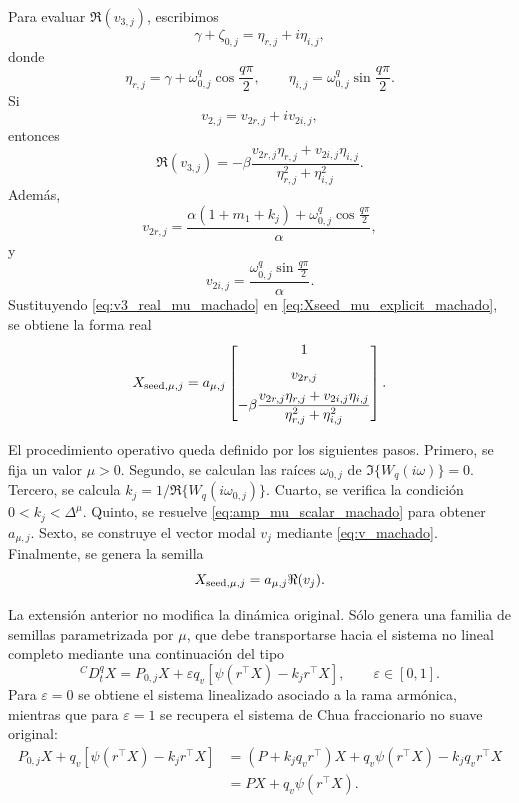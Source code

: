 Para evaluar \(\Re(v_{3,j})\), escribimos
\begin{equation}
\label{eq:eta_mu_machado}
\gamma+\zeta_{0,j}
=
\eta_{r,j}+i\eta_{i,j},
\end{equation}
donde
\begin{equation}
\eta_{r,j}
=
\gamma+\omega_{0,j}^q\cos\frac{q\pi}{2},
\qquad
\eta_{i,j}
=
\omega_{0,j}^q\sin\frac{q\pi}{2}.
\end{equation}
Si
\[
v_{2,j}=v_{2r,j}+iv_{2i,j},
\]
entonces
\begin{equation}
\label{eq:v3_real_mu_machado}
\Re(v_{3,j})
=
-\beta
\frac{
v_{2r,j}\eta_{r,j}+v_{2i,j}\eta_{i,j}
}{
\eta_{r,j}^2+\eta_{i,j}^2
}.
\end{equation}
Además,
\begin{equation}
\label{eq:v2r_mu_machado}
v_{2r,j}
=
\frac{
\alpha(1+m_1+k_j)+
\omega_{0,j}^q\cos\frac{q\pi}{2}
}{\alpha},
\end{equation}
y
\begin{equation}
\label{eq:v2i_mu_machado}
v_{2i,j}
=
\frac{
\omega_{0,j}^q\sin\frac{q\pi}{2}
}{\alpha}.
\end{equation}
Sustituyendo \eqref{eq:v3_real_mu_machado} en
\eqref{eq:Xseed_mu_explicit_machado}, se obtiene la forma real
\begin{equation}
\label{eq:Xseed_mu_final_machado}
X_{{\rm seed},\mu,j}
=
a_{\mu,j}
\begin{bmatrix}
1\\[2mm]
v_{2r,j}\\[2mm]
-\beta
\dfrac{
v_{2r,j}\eta_{r,j}+v_{2i,j}\eta_{i,j}
}{
\eta_{r,j}^2+\eta_{i,j}^2
}
\end{bmatrix}.
\end{equation}

El procedimiento operativo queda definido por los siguientes pasos. Primero,
se fija un valor \(\mu>0\). Segundo, se calculan las raíces
\(\omega_{0,j}\) de \(\Im\{W_q(i\omega)\}=0\). Tercero, se calcula
\(k_j=1/\Re\{W_q(i\omega_{0,j})\}\). Cuarto, se verifica la condición
\(0<k_j<\Delta^\mu\). Quinto, se resuelve
\eqref{eq:amp_mu_scalar_machado} para obtener \(a_{\mu,j}\). Sexto, se
construye el vector modal \(v_j\) mediante \eqref{eq:v_machado}. Finalmente,
se genera la semilla
\[
X_{{\rm seed},\mu,j}
=
a_{\mu,j}\Re(v_j).
\]

La extensión anterior no modifica la dinámica original. Sólo genera una
familia de semillas parametrizada por \(\mu\), que debe transportarse hacia
el sistema no lineal completo mediante una continuación del tipo
\begin{equation}
\label{eq:continuation_mu_machado}
{}^CD_t^qX
=
P_{0,j}X
+
\varepsilon q_v
\left[
\psi(r^\top X)-k_jr^\top X
\right],
\qquad
\varepsilon\in[0,1].
\end{equation}
Para \(\varepsilon=0\) se obtiene el sistema linealizado asociado a la rama
armónica, mientras que para \(\varepsilon=1\) se recupera el sistema de Chua
fraccionario no suave original:
\begin{align}
P_{0,j}X
+
q_v\left[\psi(r^\top X)-k_jr^\top X\right]
&=
\left(P+k_jq_vr^\top\right)X
+
q_v\psi(r^\top X)
-
k_jq_vr^\top X
\nonumber\\
&=
PX+q_v\psi(r^\top X).
\end{align}

